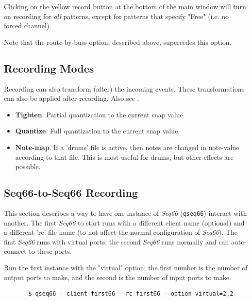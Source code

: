    Clicking on the yellow record button at the bottom of the main window
   will turn on recording for \textsl{all}
   patterns, except for patterns that specify "Free" (i.e. no forced channel).

   Note that the route-by-buss option, described above, supercedes this
   option.

\subsection{Recording Modes}
\label{sec:recording_modes}

   Recording can also transform (alter) the incoming events.
   These transformations can also be applied after recording.
   Also see .

   \begin{itemize}
      \item \textbf{Tighten}.
         Partial quantization to the current snap value.
      \item \textbf{Quantize}.
         Full quantization to the current snap value.
      \item \textbf{Note-map}.
         If a 'drums' file is active, then notes are changed
         in note-value according to that file.
         This is most useful for drums, but other effects are possible.
   \end{itemize}

\subsection{Seq66-to-Seq66 Recording}
\label{sec:recording_seq_to_seq}

   This section describes a way to have one instance of \textsl{Seq66}
   (\texttt{qseq66}) interact with another.
   The first \textsl{Seq66} to start runs with a different client name
   (optional) and a different 'rc' file name (to not affect the normal
   configuration of \textsl{Seq66}).
   The first \textsl{Seq66} runs with virtual ports; the second
   \textsl{Seq66} runs normally and can auto-connect to these
   ports.

   Run the first instance with
   the "virtual" option; the first number is the number of output ports
   to make, and the second is the number of input ports to make.

   \begin{verbatim}
       $ qseq66 --client first66 --rc first66 --option virtual=2,2
   \end{verbatim}

